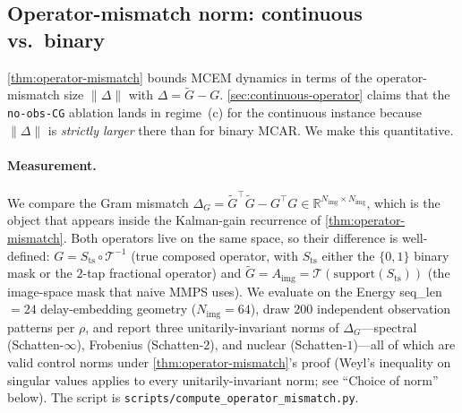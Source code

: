 \documentclass{article}
\theoremstyle{plain}
\theoremstyle{definition}
\theoremstyle{remark}
\newcommand{\tsimg}{\mathcal{T}}
\newcommand{\imgts}{\mathcal{T}^{-1}}
\newcommand{\Nimg}{N_{\mathrm{img}}}
\newcommand{\Aimg}{A_{\mathrm{img}}}
\begin{document}
\subsection{Operator-mismatch norm: continuous vs.\ binary}
\label{app:continuous-mismatch-norm}

\cref{thm:operator-mismatch} bounds MCEM dynamics in terms of the operator-mismatch size $\|\Delta\|$ with $\Delta = \tilde{G} - G$. \cref{sec:continuous-operator} claims that the \texttt{no-obs-CG} ablation lands in regime~(c) for the continuous instance because $\|\Delta\|$ is \emph{strictly larger} there than for binary MCAR. We make this quantitative.

\paragraph{Measurement.}
We compare the Gram mismatch $\Delta_G = \tilde{G}^{\top}\tilde{G} - G^{\top} G \in \mathbb{R}^{\Nimg \times \Nimg}$, which is the object that appears inside the Kalman-gain recurrence of \cref{thm:operator-mismatch}. Both operators live on the same space, so their difference is well-defined: $G = S_{\mathrm{ts}} \circ \imgts$ (true composed operator, with $S_{\mathrm{ts}}$ either the $\{0,1\}$ binary mask or the $2$-tap fractional operator) and $\tilde{G} = \Aimg = \tsimg(\mathrm{support}(S_{\mathrm{ts}}))$ (the image-space mask that naive MMPS uses). We evaluate on the Energy seq\_len $=24$ delay-embedding geometry ($\Nimg = 64$), draw $200$ independent observation patterns per $\rho$, and report three unitarily-invariant norms of $\Delta_G$---spectral (Schatten-$\infty$), Frobenius (Schatten-$2$), and nuclear (Schatten-$1$)---all of which are valid control norms under \cref{thm:operator-mismatch}'s proof (Weyl's inequality on singular values applies to every unitarily-invariant norm; see ``Choice of norm'' below). The script is \texttt{scripts/compute\_operator\_mismatch.py}.
\end{document}
